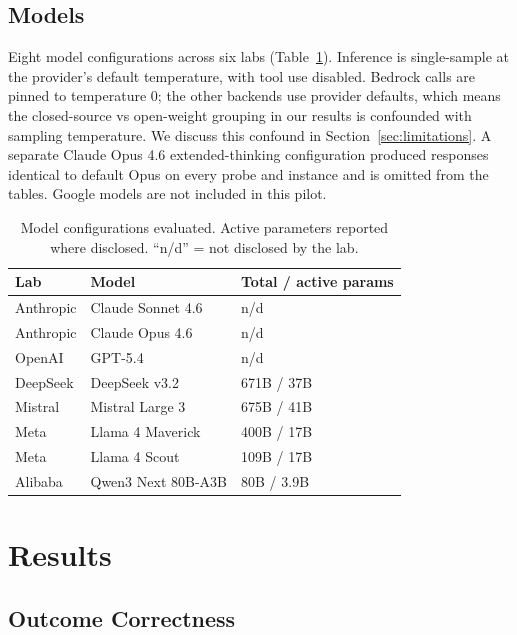 \documentclass[11pt]{article}
\begin{document}
\subsection{Models}

Eight model configurations across six labs (Table~\ref{tab:models}). Inference is single-sample at the provider's default temperature, with tool use disabled. Bedrock calls are pinned to temperature $0$; the other backends use provider defaults, which means the closed-source vs open-weight grouping in our results is confounded with sampling temperature. We discuss this confound in Section~\ref{sec:limitations}. A separate Claude Opus 4.6 extended-thinking configuration produced responses identical to default Opus on every probe and instance and is omitted from the tables. Google models are not included in this pilot.

\begin{table}[t]
\centering
\caption{Model configurations evaluated. Active parameters reported where disclosed. ``n/d'' = not disclosed by the lab.}
\label{tab:models}
\small
\begin{tabular}{@{}lll@{}}
\toprule
\textbf{Lab} & \textbf{Model} & \textbf{Total / active params} \\
\midrule
Anthropic & Claude Sonnet 4.6 & n/d \\
Anthropic & Claude Opus 4.6 & n/d \\
OpenAI & GPT-5.4 & n/d \\
DeepSeek & DeepSeek v3.2 & 671B / 37B \\
Mistral & Mistral Large 3 & 675B / 41B \\
Meta & Llama 4 Maverick & 400B / 17B \\
Meta & Llama 4 Scout & 109B / 17B \\
Alibaba & Qwen3 Next 80B-A3B & 80B / 3.9B \\
\bottomrule
\end{tabular}
\end{table}

\section{Results}
\label{sec:results}

\subsection{Outcome Correctness}
\end{document}
